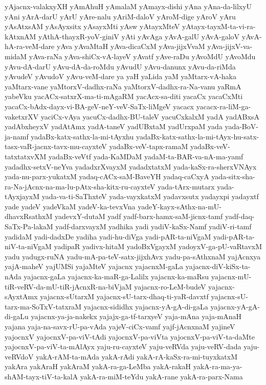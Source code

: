 {yAjacnx-valakxyXH
yAmAhuH
yAmalaM
yAmayx-dishi
yAna
yAna-da-lilxyU
yAni
yArA-darU
yArU
yAre-nalu
yAriM-daloV
yAroM-dige
yAroV
yAru
yAsAtxsAM
yAsAyxsitx
yAsayxMti
yAsw
yAtayxMteV
yAtayx-tayxM-ta-vi-ra-kAtxnAM
yAthA-thayxR-yoV-giniV
yAti
yAvAga
yAvA-galU
yAvA-galoV
yAvA-hA-ra-veM-dare
yAva
yAvaMtaH
yAva-dicaCxM
yAva-jijxVvaM
yAva-jijxV-va-midaM
yAva-raNa
yAva-shiCx-vA-layeV
yAvatf
yAve-raDu
yAvoMdU
yAvoMdu
yAvu-dA-darU
yAvu-dA-da-roMdu
yAvudU
yAvu-danunx
yAvu-da-riMda
yAvudeV
yAvudoV
yAvu-veM-dare
ya
yaH
yaLida
yaM
yaMtarx-vA-haka
yaMtarx-vane
yaMtorxV-dadhx-raNa
yaMtorxV-dadhx-ra-Na-vanu
yaRmA
yabeVku
yacACx-satxrX-ma-ti-mAgaRM
yacAcx-sa-diti
yacaCx
yacaCxMti
yacaCx-bAdx-dayx-vi-BA-geV-neY-veV-SaTx-liMgeV
yacacx
yacacx-ra-liM-ga-vaketxrXV
yaciCx-vAya
yacuCx-dadhx-BU-taleV
yacuCxkalxM
yadA
yadABxsA
yadAbxheyxV
yadAtAmx
yadA-taneV
yadUBxtaM
yadUrxpaM
yada
yada-BoV-ja-namf
yadaBx-katx-sathx-la-mi-tAyxhu
yadaBx-katx-sathx-la-mi-tAyx-hu-satx-tasx-vaR-jacnx-tavx-mu-cayxteV
yadaBx-veV-tapx-ramaM
yadaBx-veV-tatxtatxvXM
yadaBx-veVtf
yada-KaMDaM
yadaM-ta-BAR-va-nA-ma-yamf
yadadhx-setxV-neYva
yadadxrXvayxM
yadadxtatxM
yada-kaSx-ra-sherxVNAyx
yada-nu-parx-yukatxM
yadaq-cACx-saM-BaveYH
yadaq-caCxyA
yada-sitx-sha-ra-Na-jAcnx-na-ma-lu-pAtx-sha-kitx-ru-cayxteV
yada-tArx-mutarx
yada-tAyxjayxM
yada-va-ti-SaThxteV
yada-vayxkatxM
yadavxsutx
yadayxpi
yadayxtf
yade
yadeV
yadeVkaM
yadeV-ka-tevxVna
yadeY-kayx-sAthx-na-mU-dhavxRsathxM
yadevxY-dutaM
yadf
yadf-barx-hamx-saM-jicnx-tamf
yadf-daq-SaTx-Pa-lakaM
yadf-darxvayxM
yadhika
yadi
yadiV-kaSx-Namf
yadiV-ri-tamf
yadidaM
yadi-dadxDe
yadiha
yadi-hu-diVga
yadi-pAR-ta-niVgaM
yadi-pAR-ta-niV-ta-niVgaM
yadipaR
yadivx-hitaM
yadoBxVgayxM
yadoyxV-ga-pU-vaRtavxM
yadu
yadugx-ruNA
yadu-mA-pa-teV-satx-jijxhAvx
yadu-pa-sAthxnaM
yajAcnxya
yajA-maheV
yajUMSi
yajaMteV
yajacnx
yajacnxM-gaLa
yajacnx-diV-kiSx-ta-nAda
yajacnx-gaLa
yajacnx-ka-maR-ga-Lalilx
yajacnx-ka-maRsu
yajacnx-mU-tiR-veRV-da-mU-tiR-jAcnxR-na-biVjaM
yajacnx-ro-LeM-budeV
yajacnx-sAyxtAmx
yajacnx-sUtarxM
yajacnx-sU-tarx-dhaq-ti-yaR-davxtf
yajacnx-sU-tarx-ma-SoTxV-tatxraM
yajacnx-sididhx
yajacnx-yA-gA-di-gaLa
yajacnx-yA-gA-di-gaLu
yajacnx-ya-ja-nakekx
yajajx-ga-tf-tarxyeV
yaja-mAna
yaja-mAnaH
yajana
yaja-na-savx-rU-pa-vAda
yajeV-ciCx-vamf
yajf-jAcnxnaM
yajineV
yajocnxV
yajocnxV-pa-viV-tAdi
yajocnxV-pa-viVta
yajocnxV-pa-viV-ta-daMte
yajocnxV-pa-viV-ta-mAlAyx
yaju-ru-cayxteV
yaju-veRVda
yaju-veRV-dada
yaju-veRVdoV
yakA-rAM-ta-mAda
yakA-rAdi
yakA-rA-kaSx-ra-mi-tuyxkatxM
yakAra
yakAraH
yakAraM
yakA-ra-ga-LeMba
yakA-rakaH
yakA-ra-ma-ya-shAM-tayx-tiV-ta-kalA
yakA-ra-miM-teYdu
yakA-rane
yakA-ra-parx-Nama
}
